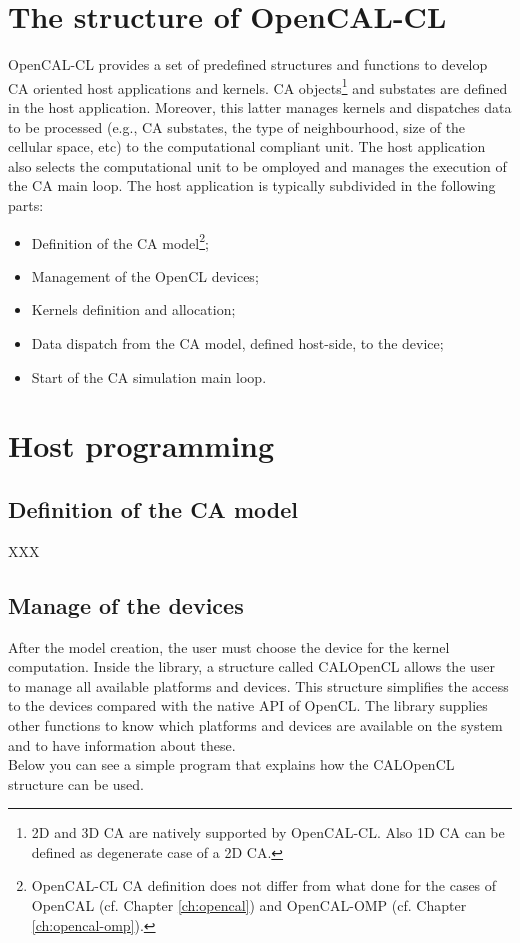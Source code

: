 \section{The structure of OpenCAL-CL}
OpenCAL-CL provides a set of predefined structures and functions to
develop CA oriented host applications and kernels. CA
objects\footnote{2D and 3D CA are natively supported by
  OpenCAL-CL. Also 1D CA can be defined as degenerate case of a 2D
  CA.} and substates are defined in the host application. Moreover,
this latter manages kernels and dispatches data to be processed (e.g.,
CA substates, the type of neighbourhood, size of the cellular space,
etc) to the computational compliant unit. The host application also
selects the computational unit to be omployed and manages the
execution of the CA main loop. The host application is typically
subdivided in the following parts:
\begin{itemize}
\item Definition of the CA model\footnote{OpenCAL-CL CA definition
  does not differ from what done for the cases of OpenCAL (cf. Chapter
  \ref{ch:opencal}) and OpenCAL-OMP (cf. Chapter
  \ref{ch:opencal-omp}).};
\item Management of the OpenCL devices;
\item Kernels definition and allocation;
\item Data dispatch from the CA model, defined host-side, to the device;
\item Start of the CA simulation main loop.
\end{itemize}

\section{Host programming} 

\subsection{Definition of the CA model}

XXX

\subsection{Manage of the devices}

After the model creation, the user must choose the device for the
kernel computation.  Inside the library, a structure called CALOpenCL
allows the user to manage all available platforms and devices.  This
structure simplifies the access to the devices compared with the
native API of OpenCL. The library supplies other functions to know
which platforms and devices are available on the system and to have
information about these.\\ Below you can see a simple program that
explains how the CALOpenCL structure can be used.



